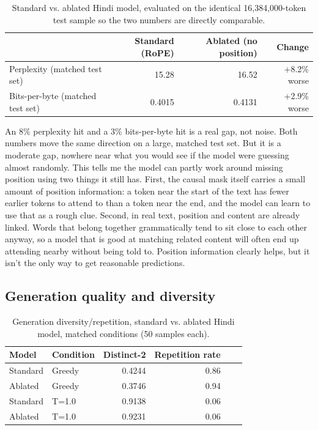 \documentclass[10pt]{article}
\begin{document}
\begin{table}[h]
\centering
\small
\begin{tabular}{lrrr}
\toprule
 & Standard (RoPE) & Ablated (no position) & Change \\
\midrule
Perplexity (matched test set) & 15.28 & 16.52 & +8.2\% worse \\
Bits-per-byte (matched test set) & 0.4015 & 0.4131 & +2.9\% worse \\
\bottomrule
\end{tabular}
\caption{Standard vs. ablated Hindi model, evaluated on the identical 16,384,000-token test sample so the two numbers are directly comparable.}
\end{table}

An 8\% perplexity hit and a 3\% bits-per-byte hit is a real gap, not noise. Both numbers move the same direction on a large, matched test set. But it is a moderate gap, nowhere near what you would see if the model were guessing almost randomly. This tells me the model can partly work around missing position using two things it still has. First, the causal mask itself carries a small amount of position information: a token near the start of the text has fewer earlier tokens to attend to than a token near the end, and the model can learn to use that as a rough clue. Second, in real text, position and content are already linked. Words that belong together grammatically tend to sit close to each other anyway, so a model that is good at matching related content will often end up attending nearby without being told to. Position information clearly helps, but it isn't the only way to get reasonable predictions.

\subsection{Generation quality and diversity}

\begin{table}[h]
\centering
\small
\begin{tabular}{llrrrr}
\toprule
Model & Condition & Distinct-2 & Repetition rate \\
\midrule
Standard & Greedy & 0.4244 & 0.86 \\
Ablated & Greedy & 0.3746 & 0.94 \\
Standard & T=1.0 & 0.9138 & 0.06 \\
Ablated & T=1.0 & 0.9231 & 0.06 \\
\bottomrule
\end{tabular}
\caption{Generation diversity/repetition, standard vs. ablated Hindi model, matched conditions (50 samples each).}
\end{table}
\end{document}
